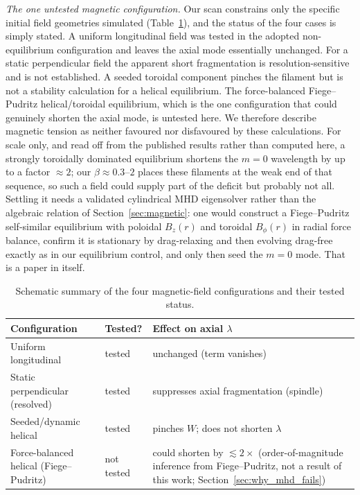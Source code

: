 \documentclass[usenatbib,twoside,twocolumn]{mnras}
\begin{document}
\emph{The one untested magnetic configuration.} Our scan constrains only the specific initial field geometries simulated (Table~\ref{tab:magcases}), and the status of the four cases is simply stated. A uniform longitudinal field was tested in the adopted non-equilibrium configuration and leaves the axial mode essentially unchanged. For a static perpendicular field the apparent short fragmentation is resolution-sensitive and is not established. A seeded toroidal component pinches the filament but is not a stability calculation for a helical equilibrium. The force-balanced Fiege--Pudritz helical/toroidal equilibrium, which is the one configuration that could genuinely shorten the axial mode, is untested here. We therefore describe magnetic tension as neither favoured nor disfavoured by these calculations. For scale only, and read off from the published \citet{Fiege2000} results rather than computed here, a strongly toroidally dominated equilibrium shortens the $m=0$ wavelength by up to a factor $\approx2$; our $\beta\approx0.3$--$2$ places these filaments at the weak end of that sequence, so such a field could supply part of the deficit but probably not all. Settling it needs a validated cylindrical MHD eigensolver rather than the algebraic relation of Section~\ref{sec:magnetic}: one would construct a Fiege--Pudritz self-similar equilibrium with poloidal $B_z(r)$ and toroidal $B_\phi(r)$ in radial force balance, confirm it is stationary by drag-relaxing and then evolving drag-free exactly as in our equilibrium control, and only then seed the $m=0$ mode. That is a paper in itself.

\begin{table}
\caption{Schematic summary of the four magnetic-field configurations and their tested status.}
\label{tab:magcases}
\footnotesize
\setlength{\tabcolsep}{4pt}
\begin{tabular}{@{}p{2.9cm}lp{3.0cm}@{}}
\toprule
Configuration & Tested? & Effect on axial $\lambda$ \\
\midrule
Uniform longitudinal & tested & unchanged (term vanishes) \\
Static perpendicular (resolved) & tested & suppresses axial fragmentation (spindle) \\
Seeded/dynamic helical & tested & pinches $W$; does not shorten $\lambda$ \\
Force-balanced helical (Fiege--Pudritz) & not tested & could shorten by $\lesssim2\times$ (order-of-magnitude inference from Fiege--Pudritz, not a result of this work; Section~\ref{sec:why_mhd_fails}) \\
\bottomrule
\end{tabular}
\end{table}
\end{document}
